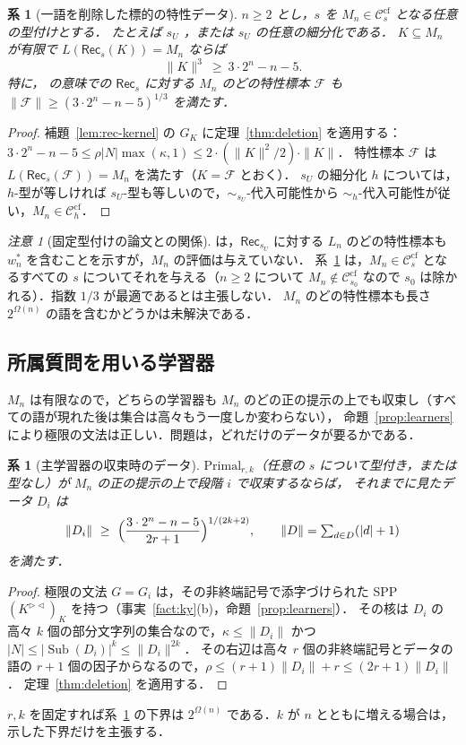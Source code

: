 \documentclass[11pt,a4paper]{ltjsarticle}
\numberwithin{equation}{section}
\theoremstyle{plain}
\newtheorem{corollary}[theorem]{系}
\theoremstyle{definition}
\theoremstyle{remark}
\newtheorem{remark}[theorem]{注意}
\theoremstyle{plain}
\newcommand{\RL}{^{\rhd\lhd}}
\newcommand{\Sub}{\operatorname{Sub}}
\newcommand{\Ccf}[1]{\mathcal C^{\mathrm{cf}}_{#1}}
\begin{document}
\begin{corollary}[一語を削除した標的の特性データ]
\label{cor:rec-data}
$n\ge2$ とし，$s$ を $M_n\in\Ccf s$ となる任意の型付けとする．
たとえば $s_U$ \citep[Prop.~6.4(iv)]{kuriyama-tcs1}，または $s_U$ の任意の細分化である．
$K\subseteq M_n$ が有限で $L(\mathsf{Rec}_s(K))=M_n$ ならば
\[
\|K\|^3\ \ge\ 3\cdot2^n-n-5 .
\]
特に，\citet[Sec.~2]{kuriyama-tcs1} の意味での $\mathsf{Rec}_s$ に対する $M_n$ のどの特性標本 $\mathcal F$ も
$\|\mathcal F\|\ge(3\cdot2^n-n-5)^{1/3}$ を満たす．
\end{corollary}
\begin{proof}
補題~\ref{lem:rec-kernel} の $G_K$ に定理~\ref{thm:deletion} を適用する：
$3\cdot2^n-n-5\le\rho|N|\max(\kappa,1)\le2\cdot(\|K\|^2/2)\cdot\|K\|$．
特性標本 $\mathcal F$ は $L(\mathsf{Rec}_s(\mathcal F))=M_n$ を満たす（$K=\mathcal F$ とおく）．
$s_U$ の細分化 $h$ については，$h$-型が等しければ $s_U$-型も等しいので，$\sim_{s_U}$-代入可能性から $\sim_h$-代入可能性が従い，$M_n\in\Ccf h$．
\end{proof}

\begin{remark}[固定型付けの論文との関係]\label{rem:rec-data}
\citet[Prop.~6.4]{kuriyama-tcs1} は，$\mathsf{Rec}_{s_U}$ に対する $L_n$ のどの特性標本も $w^*_n$ を含むことを示すが，$M_n$ の評価は与えていない．
系~\ref{cor:rec-data} は，$M_n\in\Ccf s$ となるすべての $s$ についてそれを与える（$n\ge2$ について $M_n\notin\Ccf{s_0}$ なので $s_0$ は除かれる）．指数 $1/3$ が最適であるとは主張しない．
$M_n$ のどの特性標本も長さ $2^{\Omega(n)}$ の語を含むかどうかは未解決である．
\end{remark}

\subsection*{所属質問を用いる学習器}

$M_n$ は有限なので，どちらの学習器も $M_n$ のどの正の提示の上でも収束し（すべての語が現れた後は集合は高々もう一度しか変わらない），
命題~\ref{prop:learners} により極限の文法は正しい．問題は，どれだけのデータが要るかである．

\begin{corollary}[主学習器の収束時のデータ]\label{cor:primal-data}
$\mathrm{Primal}_{r,k}$（任意の $s$ について型付き，または型なし）が $M_n$ の正の提示の上で段階 $i$ で収束するならば，
それまでに見たデータ $D_i$ は
\[
\|D_i\|\ \ge\ \Bigl(\frac{3\cdot2^n-n-5}{2r+1}\Bigr)^{1/(2k+2)},
\qquad \|D\|=\textstyle\sum_{d\in D}(|d|+1)
\]
を満たす．
\end{corollary}
\begin{proof}
極限の文法 $G=G_i$ は，その非終端記号で添字づけられた SPP $(K\RL)_K$ を持つ（事実~\ref{fact:ky}(b)，命題~\ref{prop:learners}）．
その核は $D_i$ の高々 $k$ 個の部分文字列の集合なので，$\kappa\le\|D_i\|$ かつ $|N|\le|\Sub(D_i)|^k\le\|D_i\|^{2k}$．
その右辺は高々 $r$ 個の非終端記号とデータの語の $r+1$ 個の因子からなるので，$\rho\le(r+1)\|D_i\|+r\le(2r+1)\|D_i\|$．
定理~\ref{thm:deletion} を適用する．
\end{proof}
$r,k$ を固定すれば系~\ref{cor:primal-data} の下界は $2^{\Omega(n)}$ である．$k$ が $n$ とともに増える場合は，示した下界だけを主張する．
\end{document}
